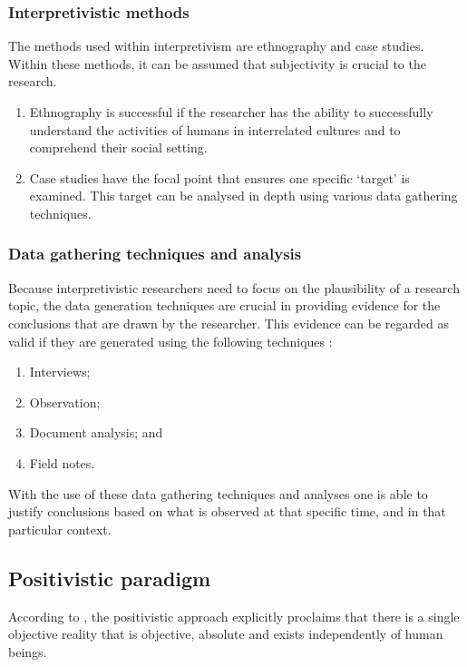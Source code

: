 \subsubsection{Interpretivistic methods}
The methods used within interpretivism are ethnography and case studies. Within these methods, it can be assumed that subjectivity is crucial to the research. 
\begin{enumerate}[label=\roman*.]
	\item Ethnography is successful if the researcher has the ability to successfully understand the activities of humans in interrelated cultures and to comprehend their social setting.
	\item Case studies have the focal point that ensures one specific ‘target’ is examined. This target can be analysed in depth using various data gathering techniques.
\end{enumerate}

\subsubsection{Data gathering techniques and analysis}
Because interpretivistic researchers need to focus on the plausibility of a research topic, the data generation techniques are crucial in providing evidence for the conclusions that are drawn by the researcher. This evidence can be regarded as valid if they are generated using the following techniques \citep{OatesJ2006}:
\begin{enumerate}[label=\roman*.]
	\item Interviews;
	\item Observation;
	\item Document analysis; and
	\item Field notes.
\end{enumerate}

With the use of these data gathering techniques and analyses one is able to justify conclusions based on what is observed at that specific time, and in that particular context.

\subsection{Positivistic paradigm}
According to \cite{DeVilliers2005}, the positivistic approach explicitly proclaims that there is a single objective reality that is objective, absolute and exists independently of human beings. 

